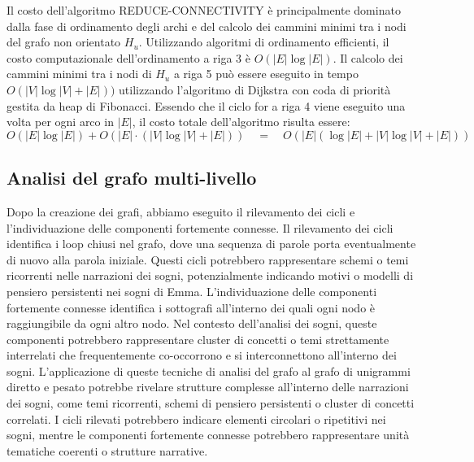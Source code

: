 Il costo dell'algoritmo REDUCE-CONNECTIVITY è principalmente dominato dalla fase di ordinamento degli archi
e del calcolo dei cammini minimi tra i nodi del grafo non orientato $H_u$.
Utilizzando algoritmi di ordinamento efficienti, il costo computazionale dell'ordinamento a riga 3 è $O(|E| \log |E|)$.
Il calcolo dei cammini minimi tra i nodi di $H_u$ a riga 5 può essere eseguito in tempo $O(|V| \log{|V|} + |E|))$
utilizzando l'algoritmo di Dijkstra con coda di priorità gestita da heap di Fibonacci.
Essendo che il ciclo for a riga 4 viene eseguito una volta per ogni arco in $|E|$, il costo totale dell'algoritmo
risulta essere:
\begin{equation*}
      O(|E| \log |E|) + O(|E| \cdot (|V| \log{|V|} + |E|)) \quad = \quad
      O(|E| (\log |E| + |V| \log{|V|} + |E|))
\end{equation*}

\subsection{Analisi del grafo multi-livello}\label{subsec:analisi-del-grafo-multi-livello}







Dopo la creazione dei grafi, abbiamo eseguito il rilevamento dei cicli e l'individuazione delle componenti fortemente
connesse. Il rilevamento dei cicli identifica i loop chiusi nel grafo, dove una sequenza di parole porta eventualmente
di nuovo alla parola iniziale. Questi cicli potrebbero rappresentare schemi o temi ricorrenti nelle narrazioni dei sogni,
potenzialmente indicando motivi o modelli di pensiero persistenti nei sogni di Emma. L'individuazione delle componenti
fortemente connesse identifica i sottografi all'interno dei quali ogni nodo è raggiungibile da ogni altro nodo.
Nel contesto dell'analisi dei sogni, queste componenti potrebbero rappresentare cluster di concetti o temi strettamente
interrelati che frequentemente co-occorrono e si interconnettono all'interno dei sogni. L'applicazione di queste
tecniche di analisi del grafo al grafo di unigrammi diretto e pesato potrebbe rivelare strutture complesse all'interno
delle narrazioni dei sogni, come temi ricorrenti, schemi di pensiero persistenti o cluster di concetti correlati.
I cicli rilevati potrebbero indicare elementi circolari o ripetitivi nei sogni, mentre le componenti fortemente connesse
potrebbero rappresentare unità tematiche coerenti o strutture narrative.